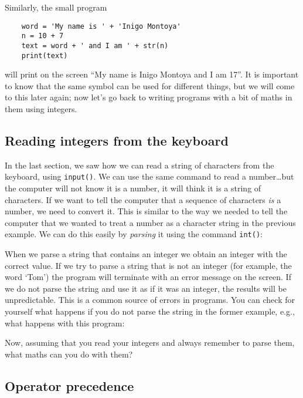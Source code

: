 Similarly, the small program

\begin{Verbatim}
    word = 'My name is ' + 'Inigo Montoya'
    n = 10 + 7
    text = word + ' and I am ' + str(n)
    print(text)
\end{Verbatim}

will print on the screen ``My name is Inigo Montoya and I am 17''. It
is important to know that the same symbol can be used for different
things, but we will come to this later again; now let's go back to
writing programs with a bit of maths in them using integers.

\subsection{Reading integers from the keyboard}
\label{sec:intkeyboard}

In the last section, we saw how we can read a string of characters
from the keyboard, 
using \verb+input()+. We can use the same command
to read a number\ldots but the computer will not know it is a number,
it will think it is a string of characters. If we want to tell the
computer that a sequence of characters \emph{is} a number,
we need to convert it.
This is similar to the way we needed to tell the computer that we
wanted to treat a number as a character string in the previous example.
We can do this easily by \emph{parsing} it using the command
\verb+int()+: 


When we parse a string that contains an integer we obtain an integer
with the correct value. If we try to parse a string that is not an
integer (for example, the word `Tom') the program will terminate with an error
message on the screen. If we do not parse the string and use it as if
it was an integer, the results will be unpredictable. This
is a common source of errors in programs. You can check for yourself
what happens if you do not parse the string in the former example,
e.g., what happens with this program:


Now, assuming that you read your integers and always remember to parse
them, what maths can you do with them?

\subsection{Operator precedence}
\label{sec:prec}

